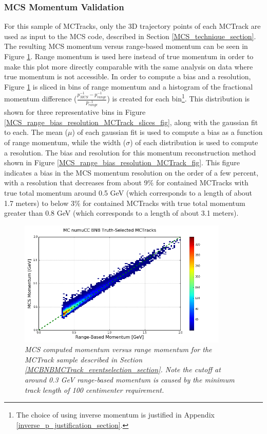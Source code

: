\subsubsection{MCS Momentum Validation}\label{MCS_Momentum_Validation_MCTrack_section}
For this sample of {\sc MCTracks}, only the 3D trajectory points of each {\sc MCTrack} are used as input to the MCS code, described in Section \ref{MCS_technique_section}. The resulting MCS momentum versus range-based momentum can be seen in Figure \ref{MCS_range_momentum_MCTrack_fig}. Range momentum is used here instead of true momentum in order to make this plot more directly comparable with the same analysis on data where true momentum is not accessible. In order to compute a bias and a resolution, Figure \ref{MCS_range_momentum_MCTrack_fig} is sliced in bins of range momentum and a histogram of the fractional momentum difference ($\frac{p_{MCS}^{-1} - p_{range}^{-1}}{p_{range}^{-1}}$) is created for each bin\footnote{The choice of using inverse momentum is justified in Appendix \ref{inverse_p_justification_section}.}. This distribution is shown for three representative bins in Figure \ref{MCS_range_bias_resolution_MCTrack_slices_fig}, along with the gaussian fit to each.  The mean ($\mu$) of each gaussian fit is used to compute a bias as a function of range momentum, while the width ($\sigma$) of each distribution is used to compute a resolution. The bias and resolution for this momentum reconstruction method shown in Figure \ref{MCS_range_bias_resolution_MCTrack_fig}. This figure indicates a bias in the MCS momentum resolution on the order of a few percent, with a resolution that decreases from about 9\% for contained {\sc MCTracks} with true total momentum around 0.5 GeV (which corresponds to a length of about 1.7 meters) to below 3\% for contained {\sc MCTracks} with true total momentum greater than 0.8 GeV (which corresponds to a length of about 3.1 meters).


\begin{figure}[ht!]
\begin{center}
\includegraphics[width=100mm]{Figures/MCS_range_comparison_MCBNBMCTrack.png}
\end{center}
\caption{\textit{MCS computed momentum versus range momentum for the {\sc MCTrack} sample described in Section \ref{MCBNBMCTrack_eventselection_section}. Note the cutoff at around 0.3 GeV range-based momentum is caused by the minimum track length of 100 centimenter requirement.}}
\label{MCS_range_momentum_MCTrack_fig}
\end{figure}

